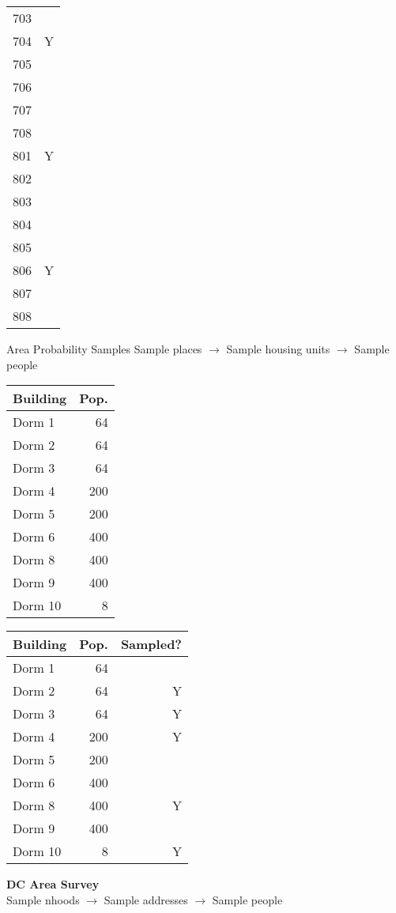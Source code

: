 \documentclass[]{beamer}
\begin{document}
\begin{frame}
\begin{center}
\begin{minipage}{.4\textwidth}
\begin{tabular}{lr}
703 & \\
704 &Y  \\ 
705 & \\
706 & \\ 
707 & \\
708 &\\
801 & Y \\
802 &  \\
803 & \\
804 & \\ 
805 & \\
806 & Y \\ 
807 & \\
808 &\\ \bottomrule
\end{tabular}
\end{minipage}
\end{center}
\end{frame}

\begin{frame}{Area Probability Samples}
Sample places $\longrightarrow$ Sample housing units $\longrightarrow$ Sample people
\end{frame}

\begin{frame}
\begin{tabular}{lr}
\textbf{Building} & \textbf{Pop.} \\ \toprule
Dorm 1 & 64 \\
Dorm 2 & 64 \\
Dorm 3 & 64 \\
Dorm 4 & 200 \\
Dorm 5 & 200 \\
Dorm 6 & 400 \\
Dorm 8 & 400 \\
Dorm 9 & 400 \\
Dorm 10 & 8 \\ \bottomrule
\end{tabular}
\end{frame}


\begin{frame}
\begin{tabular}{lrr}
\textbf{Building} & \textbf{Pop.} & \textbf{Sampled?} \\ \toprule
Dorm 1 & 64 & \\
Dorm 2 & 64 & Y\\
Dorm 3 & 64 & Y \\ \midrule
Dorm 4 & 200& Y  \\
Dorm 5 & 200 & \\ \midrule
Dorm 6 & 400 & \\
Dorm 8 & 400 & Y \\
Dorm 9 & 400 & \\ \midrule
Dorm 10 & 8 & Y\\ \bottomrule
\end{tabular}
\end{frame}

\begin{frame}
\textbf{DC Area Survey}\\[2em]

Sample nhoods $\longrightarrow$ Sample addresses $\longrightarrow$ Sample people

\end{frame}
\end{document}
